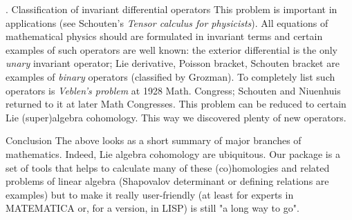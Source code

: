 . Classification of invariant differential operators\endsubhead
This problem is important in applications (see Schouten's 
{\it Tensor calculus for physicists}). All equations of mathematical
physics should
are formulated in invariant terms and certain examples of such 
operators are well known: the exterior differential is the only {\it unary}
invariant operator; Lie derivative, Poisson bracket, Schouten bracket are
examples of {\it binary} operators (classified by Grozman).  To completely
list such operators is {\it Veblen's problem} at 1928 Math. Congress;
Schouten and Niuenhuis returned  to it at later Math Congresses. This
problem can be reduced
to certain Lie  (super)algebra cohomology. This way we discovered plenty of
new operators.

\subhead Conclusion\endsubhead
The above looks as a short summary of major branches of mathematics.
Indeed, Lie algebra
cohomology are ubiquitous. Our package is a set of tools that helps to
calculate many of
these (co)homologies and related problems of linear algebra (Shapovalov
determinant or
defining relations are examples) but to make it really user-friendly (at
least for experts in
MATEMATICA or, for a version, in LISP) is still "a long way to go".


\enddocument

